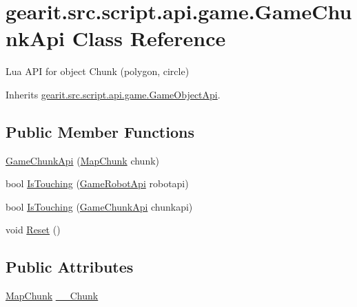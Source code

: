 \hypertarget{classgearit_1_1src_1_1script_1_1api_1_1game_1_1_game_chunk_api}{\section{gearit.\+src.\+script.\+api.\+game.\+Game\+Chunk\+Api Class Reference}
\label{classgearit_1_1src_1_1script_1_1api_1_1game_1_1_game_chunk_api}
}


Lua A\+P\+I for object Chunk (polygon, circle)  




Inherits \hyperlink{classgearit_1_1src_1_1script_1_1api_1_1game_1_1_game_object_api}{gearit.\+src.\+script.\+api.\+game.\+Game\+Object\+Api}.

\subsection*{Public Member Functions}
\begin{DoxyCompactItemize}
\item 
\hyperlink{classgearit_1_1src_1_1script_1_1api_1_1game_1_1_game_chunk_api_a205987f87ffa1c32e7c16c9f588b861d}{Game\+Chunk\+Api} (\hyperlink{classgearit_1_1src_1_1editor_1_1map_1_1_map_chunk}{Map\+Chunk} chunk)
\item 
bool \hyperlink{classgearit_1_1src_1_1script_1_1api_1_1game_1_1_game_chunk_api_ab3ab082bd06d93b442590f9d31e06f68}{Is\+Touching} (\hyperlink{classgearit_1_1src_1_1script_1_1api_1_1game_1_1_game_robot_api}{Game\+Robot\+Api} robotapi)
\item 
bool \hyperlink{classgearit_1_1src_1_1script_1_1api_1_1game_1_1_game_chunk_api_a3af6cb5a95e0cfab7453c7b6703c178a}{Is\+Touching} (\hyperlink{classgearit_1_1src_1_1script_1_1api_1_1game_1_1_game_chunk_api}{Game\+Chunk\+Api} chunkapi)
\item 
void \hyperlink{classgearit_1_1src_1_1script_1_1api_1_1game_1_1_game_chunk_api_a1446e34a9084a7169adef4fed911cd46}{Reset} ()
\end{DoxyCompactItemize}
\subsection*{Public Attributes}
\begin{DoxyCompactItemize}
\item 
\hyperlink{classgearit_1_1src_1_1editor_1_1map_1_1_map_chunk}{Map\+Chunk} \hyperlink{classgearit_1_1src_1_1script_1_1api_1_1game_1_1_game_chunk_api_a96f2b05dafcfea260390da98a40b46d8}{\+\_\+\+\_\+\+Chunk}
\end{DoxyCompactItemize}
